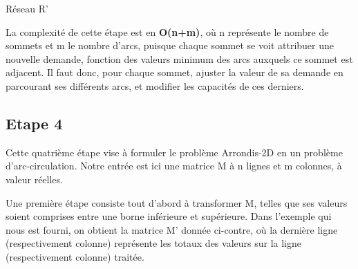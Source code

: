 \documentclass[letterpaper,12pt]{article}
\begin{document}
\begin{center}

Réseau R'
\end{center}

La complexité de cette étape est en \textbf{O(n+m)}, où n représente le nombre de sommets et m le nombre d'arcs, puisque chaque sommet se voit attribuer une nouvelle demande, fonction des valeurs minimum des arcs auxquels ce sommet est adjacent. Il faut donc, pour chaque sommet, ajuster la valeur de sa demande en parcourant ses différents arcs, et modifier les capacités de ces derniers.

\subsection{Etape 4}

Cette quatrième étape vise à formuler le problème Arrondis-2D en un problème d'arc-circulation.
Notre entrée est ici une matrice M à n lignes et m colonnes, à valeur réelles.

Une première étape consiste tout d'abord à transformer M, telles que ses valeurs soient comprises entre une borne inférieure et supérieure. Dans l'exemple qui nous est fourni, on obtient la matrice M' donnée ci-contre, où la dernière ligne (respectivement colonne) représente les totaux des valeurs sur la ligne (respectivement colonne) traitée. 
\end{document}
